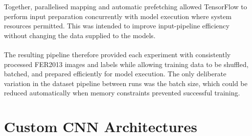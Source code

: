 \documentclass[12pt, a4paper]{report}
\let\oldsection\section
\renewcommand{\section}{%
    \Needspace{6\baselineskip}%
    \oldsection
}
\begin{document}
				Together, parallelised mapping and automatic prefetching allowed TensorFlow to perform input preparation concurrently with model execution where system resources permitted. This was intended to improve input-pipeline efficiency without changing the data supplied to the models.\\\\
				The resulting pipeline therefore provided each experiment with consistently processed FER2013 images and labels while allowing training data to be shuffled, batched, and prepared efficiently for model execution. The only deliberate variation in the dataset pipeline between runs was the batch size, which could be reduced automatically when memory constraints prevented successful training.
				
		\section{Custom CNN Architectures}
			
\end{document}
